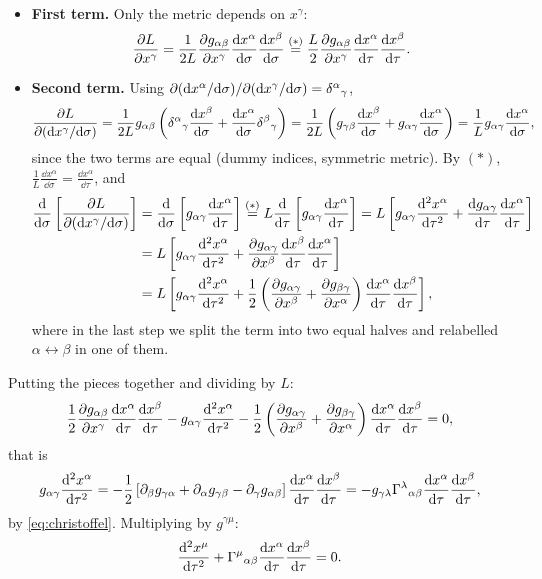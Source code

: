 \begin{itemize}
\item \textbf{First term.} Only the metric depends on $x^\gamma$:
\[
  \frac{\partial L}{\partial x^\gamma}=\frac{1}{2L}\frac{\partial g_{\alpha\beta}}{\partial x^\gamma}\frac{\mathrm{d} x^\alpha}{\mathrm{d}\sigma}\frac{\mathrm{d} x^\beta}{\mathrm{d}\sigma}
  \overset{(\ast)}{=}\frac{L}{2}\frac{\partial g_{\alpha\beta}}{\partial x^\gamma}\frac{\mathrm{d} x^\alpha}{\mathrm{d}\tau}\frac{\mathrm{d} x^\beta}{\mathrm{d}\tau}.
\]
\item \textbf{Second term.} Using $\partial(\mathrm{d} x^\alpha/\mathrm{d}\sigma)/\partial(\mathrm{d} x^\gamma/\mathrm{d}\sigma)=\delta^\alpha{}_\gamma$,
\[
  \frac{\partial L}{\partial(\mathrm{d} x^\gamma/\mathrm{d}\sigma)}=\frac{1}{2L}g_{\alpha\beta}\left(\delta^\alpha{}_\gamma\frac{\mathrm{d} x^\beta}{\mathrm{d}\sigma}+\frac{\mathrm{d} x^\alpha}{\mathrm{d}\sigma}\delta^\beta{}_\gamma\right)
  =\frac{1}{2L}\left(g_{\gamma\beta}\frac{\mathrm{d} x^\beta}{\mathrm{d}\sigma}+g_{\alpha\gamma}\frac{\mathrm{d} x^\alpha}{\mathrm{d}\sigma}\right)=\frac1L g_{\alpha\gamma}\frac{\mathrm{d} x^\alpha}{\mathrm{d}\sigma},
\]
since the two terms are equal (dummy indices, symmetric metric). By $(\ast)$, $\frac1L\frac{\dd x^\alpha}{\dd\sigma}=\frac{\dd x^\alpha}{\dd\tau}$, and
\begin{align*}
  \frac{\mathrm{d}}{\mathrm{d}\sigma}\left[\frac{\partial L}{\partial(\mathrm{d} x^\gamma/\mathrm{d}\sigma)}\right]
  &=\frac{\mathrm{d}}{\mathrm{d}\sigma}\left[g_{\alpha\gamma}\frac{\mathrm{d} x^\alpha}{\mathrm{d}\tau}\right]\overset{(\ast)}{=}L\frac{\mathrm{d}}{\mathrm{d}\tau}\left[g_{\alpha\gamma}\frac{\mathrm{d} x^\alpha}{\mathrm{d}\tau}\right]
  =L\left[g_{\alpha\gamma}\frac{\mathrm{d}^2x^\alpha}{\mathrm{d}\tau^2}+\frac{\mathrm{d} g_{\alpha\gamma}}{\mathrm{d}\tau}\frac{\mathrm{d} x^\alpha}{\mathrm{d}\tau}\right]\\
  &=L\left[g_{\alpha\gamma}\frac{\mathrm{d}^2x^\alpha}{\mathrm{d}\tau^2}+\frac{\partial g_{\alpha\gamma}}{\partial x^\beta}\frac{\mathrm{d} x^\beta}{\mathrm{d}\tau}\frac{\mathrm{d} x^\alpha}{\mathrm{d}\tau}\right]\\
  &=L\left[g_{\alpha\gamma}\frac{\mathrm{d}^2x^\alpha}{\mathrm{d}\tau^2}+\frac12\left(\frac{\partial g_{\alpha\gamma}}{\partial x^\beta}+\frac{\partial g_{\beta\gamma}}{\partial x^\alpha}\right)\frac{\mathrm{d} x^\alpha}{\mathrm{d}\tau}\frac{\mathrm{d} x^\beta}{\mathrm{d}\tau}\right],
\end{align*}
where in the last step we split the term into two equal halves and relabelled $\alpha\leftrightarrow\beta$ in one of them.
\end{itemize}
Putting the pieces together and dividing by $L$:
\[
  \frac12\frac{\partial g_{\alpha\beta}}{\partial x^\gamma}\frac{\mathrm{d} x^\alpha}{\mathrm{d}\tau}\frac{\mathrm{d} x^\beta}{\mathrm{d}\tau}-g_{\alpha\gamma}\frac{\mathrm{d}^2x^\alpha}{\mathrm{d}\tau^2}-\frac12\left(\frac{\partial g_{\alpha\gamma}}{\partial x^\beta}+\frac{\partial g_{\beta\gamma}}{\partial x^\alpha}\right)\frac{\mathrm{d} x^\alpha}{\mathrm{d}\tau}\frac{\mathrm{d} x^\beta}{\mathrm{d}\tau}=0,
\]
that is
\[
  g_{\alpha\gamma}\frac{\mathrm{d}^2x^\alpha}{\mathrm{d}\tau^2}=-\frac12\left[\partial_\beta g_{\gamma\alpha}+\partial_\alpha g_{\gamma\beta}-\partial_\gamma g_{\alpha\beta}\right]\frac{\mathrm{d} x^\alpha}{\mathrm{d}\tau}\frac{\mathrm{d} x^\beta}{\mathrm{d}\tau}
  =-g_{\gamma\lambda}\Gamma^{\lambda}{}_{\alpha\beta}\frac{\mathrm{d} x^\alpha}{\mathrm{d}\tau}\frac{\mathrm{d} x^\beta}{\mathrm{d}\tau},
\]
by \eqref{eq:christoffel}. Multiplying by $g^{\gamma\mu}$:
\begin{equation}
  \frac{\mathrm{d}^2x^\mu}{\mathrm{d}\tau^2}+\Gamma^{\mu}{}_{\alpha\beta}\frac{\mathrm{d} x^\alpha}{\mathrm{d}\tau}\frac{\mathrm{d} x^\beta}{\mathrm{d}\tau}=0 .
\end{equation}

